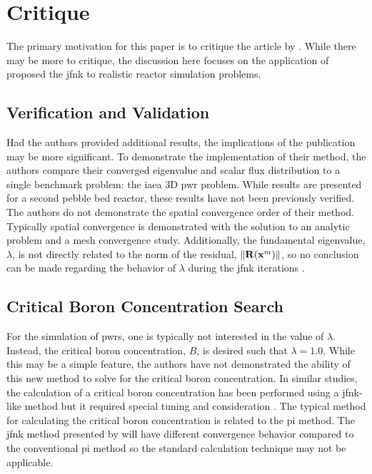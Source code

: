 \section{Critique}
\label{sec:critique}

  The primary motivation for this paper is to critique the article by
  \citeauthor{qe2paper}. While there may be more to critique, the discussion
  here focuses on the application of proposed the \gls{jfnk} to realistic
  reactor simulation problems.

  \subsection{Verification and Validation}

    Had the authors provided additional results, the implications of the
    publication may be more significant. To demonstrate the implementation of
    their method, the authors compare their converged eigenvalue and scalar flux
    distribution to a single benchmark problem: the \gls{iaea} 3D \gls{pwr}
    problem. While results are presented for a second pebble bed reactor, these
    results have not been previously verified. The authors do not demonstrate
    the spatial convergence order of their method. Typically spatial convergence
    is demonstrated with the solution to an analytic problem and a mesh
    convergence study. Additionally, the fundamental eigenvalue, $\lambda$, is
    not directly related to the norm of the residual, $\| \mathbf{R} (\mathbf{x}^m) \|$,
    so no conclusion can be made regarding the behavior of $\lambda$ during the
    \gls{jfnk} iterations \cite{caslJFNK}.

  \subsection{Critical Boron Concentration Search}

    For the simulation of \glspl{pwr}, one is typically not interested in the
    value of $\lambda$. Instead, the critical boron concentration, $B$, is
    desired such that $\lambda=1.0$. While this may be a simple feature, the
    authors have not demonstrated the ability of this new method to solve for
    the critical boron concentration. In similar studies, the calculation of a
    critical boron concentration has been performed using a \gls{jfnk}-like
    method but it required special tuning and consideration \cite{caslJFNK}. The
    typical method for calculating the critical boron concentration is related
    to the \gls{pi} method. The \gls{jfnk} method presented by
    \citeauthor{qe2paper} will have different convergence behavior compared to
    the conventional \gls{pi} method so the standard calculation technique may
    not be applicable.

